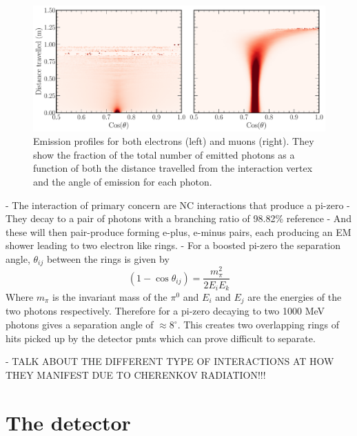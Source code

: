 \begin{figure} %
    \includegraphics[width=\textwidth]{diagrams/4-chips/emission_profile.pdf}
    \caption[Emission profiles for both electrons and muons]
    {Emission profiles for both electrons (left) and muons (right). They show the fraction of the
        total number of emitted photons as a function of both the distance travelled from the
        interaction vertex and the angle of emission for each photon.}
    \label{fig:emission_profile}
\end{figure}

- The interaction of primary concern are NC interactions that produce a pi-zero
- They decay to a pair of photons with a branching ratio of 98.82\% reference
- And these will then pair-produce forming e-plus, e-minus pairs, each producing an EM shower
leading to two electron like rings.
- For a boosted pi-zero the separation angle, $\theta_{ij}$ between the rings is given by
\begin{equation}
    (1-\cos\theta_{ij})=\frac{m_{\pi}^2}{2E_{i}E_{k}}
\end{equation}
Where $m_{\pi}$ is the invariant mass of the $\pi^{0}$ and $E_{i}$ and $E_{j}$ are the energies
of the two photons respectively.
Therefore for a pi-zero decaying to two 1000 MeV photons gives a separation angle of
$\approx 8^{\circ}$. This creates two overlapping rings of hits picked up by the detector pmts
which can prove difficult to separate.

- TALK ABOUT THE DIFFERENT TYPE OF INTERACTIONS AT HOW THEY MANIFEST DUE TO CHERENKOV RADIATION!!!

\section{The \chipsfive detector} %
\label{sec:chips_detector} %

